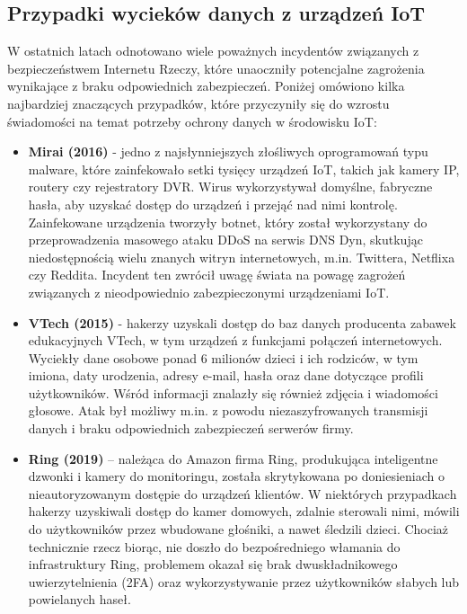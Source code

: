\subsection{Przypadki wycieków danych z urządzeń IoT}
\label{subsec:mirai}
W ostatnich latach odnotowano wiele poważnych incydentów związanych z bezpieczeństwem Internetu Rzeczy, które unaoczniły potencjalne zagrożenia wynikające z braku odpowiednich zabezpieczeń. Poniżej omówiono kilka najbardziej znaczących przypadków, które przyczyniły się do wzrostu świadomości na temat potrzeby ochrony danych w środowisku IoT:
\begin{itemize}
    \item \textbf{Mirai (2016)} - jedno z najsłynniejszych złośliwych oprogramowań typu malware, które zainfekowało setki tysięcy urządzeń IoT, takich jak kamery IP, routery czy rejestratory DVR. Wirus wykorzystywał domyślne, fabryczne hasła, aby uzyskać dostęp do urządzeń i przejąć nad nimi kontrolę. Zainfekowane urządzenia tworzyły botnet, który został wykorzystany do przeprowadzenia masowego ataku DDoS na serwis DNS Dyn, skutkując niedostępnością wielu znanych witryn internetowych, m.in. Twittera, Netflixa czy Reddita. Incydent ten zwrócił uwagę świata na powagę zagrożeń związanych z nieodpowiednio zabezpieczonymi urządzeniami IoT.
    
    \item \textbf{VTech (2015)} - hakerzy uzyskali dostęp do baz danych producenta zabawek edukacyjnych VTech, w tym urządzeń z funkcjami połączeń internetowych. Wyciekły dane osobowe ponad 6 milionów dzieci i ich rodziców, w tym imiona, daty urodzenia, adresy e-mail, hasła oraz dane dotyczące profili użytkowników. Wśród informacji znalazły się również zdjęcia i wiadomości głosowe. Atak był możliwy m.in. z powodu niezaszyfrowanych transmisji danych i braku odpowiednich zabezpieczeń serwerów firmy.
    
    \item \textbf{Ring (2019)} – należąca do Amazon firma Ring, produkująca inteligentne dzwonki i kamery do monitoringu, została skrytykowana po doniesieniach o nieautoryzowanym dostępie do urządzeń klientów. W niektórych przypadkach hakerzy uzyskiwali dostęp do kamer domowych, zdalnie sterowali nimi, mówili do użytkowników przez wbudowane głośniki, a nawet śledzili dzieci. Chociaż technicznie rzecz biorąc, nie doszło do bezpośredniego włamania do infrastruktury Ring, problemem okazał się brak dwuskładnikowego uwierzytelnienia (2FA) oraz wykorzystywanie przez użytkowników słabych lub powielanych haseł.
\end{itemize}
